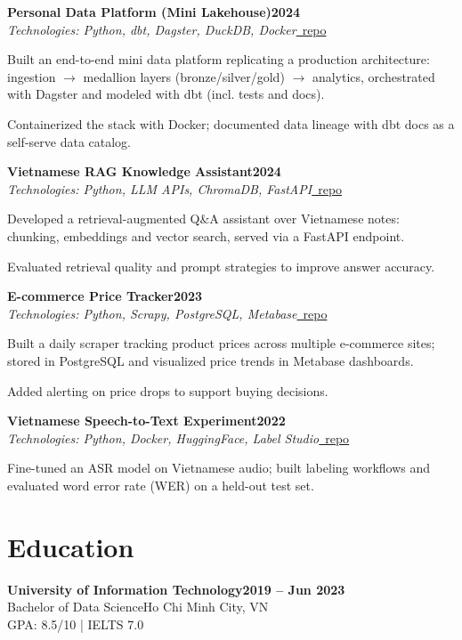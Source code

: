 \documentclass[letterpaper,10pt]{article}
\newcommand{\heading}[2]{
  \hspace{10pt}#1\hfill#2\\
}
\newcommand{\headingBf}[2]{
  \heading{\textbf{#1}}{\textbf{#2}}
}
\newenvironment{resume_list}{
  \vspace{-2pt}
  \begin{itemize}[topsep=2pt, itemsep=1pt, parsep=0pt, leftmargin=30pt, label=\textbullet]
}{
  \end{itemize}
}
\begin{document}
\headingBf{Personal Data Platform (Mini Lakehouse)}{2024}
\heading{\textit{Technologies: Python, dbt, Dagster, DuckDB, Docker}}{\href{https://github.com/namtran067}{\faGithub\ repo}}
\vspace{3pt}
\begin{resume_list}
  \item Built an end-to-end mini data platform replicating a production architecture: ingestion $\rightarrow$ medallion layers (bronze/silver/gold) $\rightarrow$ analytics, orchestrated with Dagster and modeled with dbt (incl. tests and docs).
  \item Containerized the stack with Docker; documented data lineage with dbt docs as a self-serve data catalog.
\end{resume_list}

\vspace{10pt}

\headingBf{Vietnamese RAG Knowledge Assistant}{2024}
\heading{\textit{Technologies: Python, LLM APIs, ChromaDB, FastAPI}}{\href{https://github.com/namtran067}{\faGithub\ repo}}
\vspace{3pt}
\begin{resume_list}
  \item Developed a retrieval-augmented Q\&A assistant over Vietnamese notes: chunking, embeddings and vector search, served via a FastAPI endpoint.
  \item Evaluated retrieval quality and prompt strategies to improve answer accuracy.
\end{resume_list}

\vspace{10pt}

\headingBf{E-commerce Price Tracker}{2023}
\heading{\textit{Technologies: Python, Scrapy, PostgreSQL, Metabase}}{\href{https://github.com/namtran067}{\faGithub\ repo}}
\vspace{3pt}
\begin{resume_list}
  \item Built a daily scraper tracking product prices across multiple e-commerce sites; stored in PostgreSQL and visualized price trends in Metabase dashboards.
  \item Added alerting on price drops to support buying decisions.
\end{resume_list}

\vspace{10pt}

\headingBf{Vietnamese Speech-to-Text Experiment}{2022}
\heading{\textit{Technologies: Python, Docker, HuggingFace, Label Studio}}{\href{https://github.com/namtran067}{\faGithub\ repo}}
\vspace{3pt}
\begin{resume_list}
  \item Fine-tuned an ASR model on Vietnamese audio; built labeling workflows and evaluated word error rate (WER) on a held-out test set.
\end{resume_list}

\vspace{10pt}


\section{Education}

\headingBf{University of Information Technology}{2019 -- Jun 2023}
\heading{Bachelor of Data Science}{Ho Chi Minh City, VN}
\heading{GPA: 8.5/10 | IELTS 7.0}{}
\end{document}
